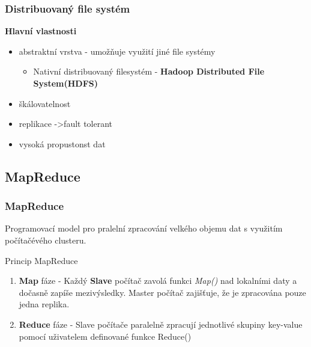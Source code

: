 \documentclass[unicode,bookmarksnumbered]{beamer}
\begin{document}
	\begin{frame}
		\frametitle{Distribuovaný file systém}
		\textbf{Hlavní vlastnosti}
		\begin{itemize}
			\item abstraktní vrstva - umožňuje využití jiné file systémy
			\begin{itemize}
				\item 		Nativní distribuovaný filesystém - \textbf{Hadoop Distributed File System(HDFS)}
			\end{itemize}
			\item škálovatelnost 
			\item replikace ->fault tolerant
			\item vysoká propustonst dat
		\end{itemize}

	\end{frame}
%


%


	\subsection{MapReduce} 
	\begin{frame}
		\frametitle{MapReduce} 
		Programovací model pro pralelní zpracování velkého objemu dat s využitím
počítačévého clusteru.
		
		Princip MapReduce   
		\begin{enumerate}
			\item \textbf{Map} fáze - Každý \textbf{Slave} počítač zavolá funkci
\textit{Map()} nad lokalními daty a dočasně zapíše mezivýsledky. Master počítač
zajišťuje, že je zpracována pouze jedna replika.
			\item \textbf{Reduce} fáze - Slave počítače paralelně zpracují jednotlivé
skupiny key-value pomocí uživatelem definované funkce Reduce()
		\end{enumerate}
	\end{frame}
%
\end{document}
